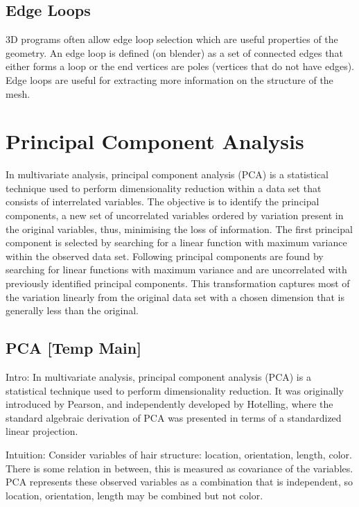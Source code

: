 \documentclass[ %
                    author={Dillon Keith Diep},
                supervisor={Dr. Carl Henrik Ek},
                    degree={MEng},
                     title={Assisted Content Generation for 3D Hair Geometry},
                  subtitle={[INCOMPLETE DRAFT, CONTAINS NOTES FROM RESEARCH]},
                      type={Research},
                      year={2014} ]{dissertation}
\begin{document}
\subsection{Edge Loops}
3D programs often allow edge loop selection which are useful properties of the geometry. An edge loop is defined (on blender) as a set of connected edges that either forms a loop or the end vertices are poles (vertices that do not have edges). Edge loops are useful for extracting more information on the structure of the mesh.
\cite{edgeloops}

\section{Principal Component Analysis}
In multivariate analysis, principal component analysis (PCA) is a statistical technique used to perform dimensionality reduction within a data set that consists of interrelated variables.
The objective is to identify the principal components, a new set of uncorrelated variables ordered by variation present in the original variables, thus, minimising the loss of information.\cite{pca2002}
The first principal component is selected by searching for a linear function with maximum variance within the observed data set.
Following principal components are found by searching for linear functions with maximum variance and are uncorrelated with previously identified principal components.
This transformation captures most of the variation linearly from the original data set with a chosen dimension that is generally less than the original.

\subsection{PCA [Temp Main]}
Intro:
In multivariate analysis, principal component analysis (PCA) is a statistical technique used to perform dimensionality reduction.\cite{pca2002} It was originally introduced by Pearson\cite{pca1901}, and independently developed by Hotelling\cite{pca1933}, where the standard algebraic derivation of PCA was presented in terms of a standardized linear projection.

Intuition:
Consider variables of hair structure: location, orientation, length, color. There is some relation in between, this is measured as covariance of the variables. PCA represents these observed variables as a combination that is independent, so location, orientation, length may be combined but not color.
\end{document}
